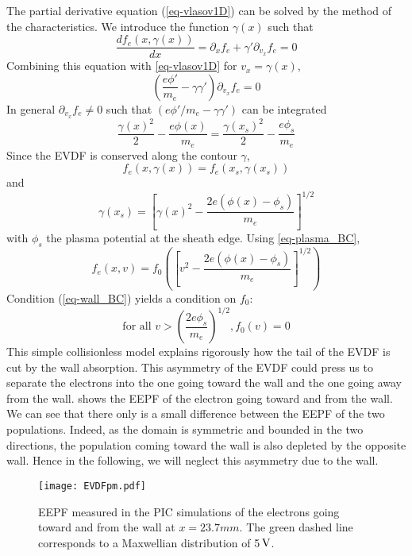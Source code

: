 The partial derivative equation (\ref{eq-vlasov1D}) can be solved by the method of the characteristics. We introduce the function $\gamma(x)$ such that
\begin{equation}
\frac{df_e(x,\gamma(x))}{dx} = \partial_x f_e + \gamma' \partial_{v_x} f_e = 0
\end{equation}
Combining this equation with \cref{eq-vlasov1D} for $v_x = \gamma(x)$,
\begin{equation}
\left( \frac{e\phi'}{m_e} - \gamma \gamma' \right) \partial_{v_x} f_e = 0
\label{eq-char}
\end{equation}
In general $\partial_{v_x} f_e \neq 0$ such that $(e\phi'/m_e - \gamma\gamma')$ can be integrated
\begin{equation}
\frac{\gamma(x)^2}{2} - \frac{e\phi(x)}{m_e} = \frac{\gamma(x_s)^2}{2} - \frac{e\phi_s}{m_e}
\end{equation}
Since the EVDF is conserved along the contour $\gamma$,
\begin{equation}
f_e(x,\gamma(x)) = f_e(x_s, \gamma(x_s))
\end{equation}
and
\begin{equation}
\gamma(x_s) = \left[ \gamma(x)^2 - \frac{2e(\phi(x) - \phi_s)}{m_e} \right]^{1/2}
\end{equation}
with $\phi_s$ the plasma potential at the sheath edge.
Using \cref{eq-plasma_BC},
\begin{equation}
f_e(x,v) = f_0\left( \left[ v^2 - \frac{2e(\phi(x) - \phi_s)}{m_e} \right]^{1/2}\right)
\label{eq-sol}
\end{equation}
Condition (\ref{eq-wall_BC}) yields a condition on $f_0$\string:
\begin{equation}
\text{for all } v > \left( \frac{2e\phi_s}{m_e} \right)^{1/2}, f_0(v) = 0
\label{eq-trunc}
\end{equation}
This simple collisionless model explains rigorously how the tail of the EVDF is cut by the wall absorption.
This asymmetry of the EVDF could press us to separate the electrons into the one going toward the wall and the one going away from the wall.
 shows the EEPF of the electron going toward and from the wall.
We can see that there only is a small difference between the  EEPF of the two populations.
Indeed, as the domain is symmetric and bounded in the two directions, the population coming toward the wall is also depleted by the opposite wall.
Hence in the following, we will neglect this asymmetry due to the wall.


\begin{figure}[!hbtp]
  \centering
  \texttt{[image: EVDFpm.pdf]}
  \caption{EEPF measured in the PIC simulations of the electrons going toward and from the wall at $x=23.7mm$. The green dashed line corresponds to a Maxwellian distribution of 5${\mathrm{\,V}}$.}
  \label{fig-EVDFpm}
\end{figure}

